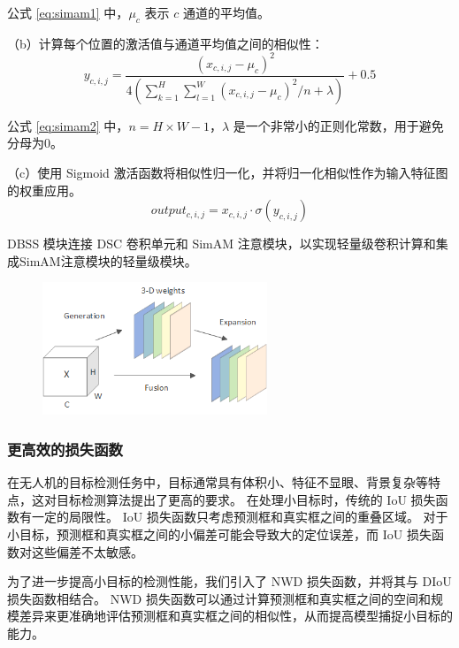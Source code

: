公式 \ref{eq:simam1} 中，$\mu_c$ 表示 $c$ 通道的平均值。

（b）计算每个位置的激活值与通道平均值之间的相似性：
\begin{equation}
    \label{eq:simam2}
    y_{c,i,j} = \frac{(x_{c,i,j}-\mu_c)^2}{4\left(\sum_{k=1}^{H}\sum_{l=1}^{W}(x_{c,i,j}-\mu_c)^2/n+\lambda \right)}+0.5
\end{equation}

公式 \ref{eq:simam2} 中，$n={H}\times{W}-1$，$\lambda$ 是一个非常小的正则化常数，用于避免分母为$0$。

（c）使用 Sigmoid 激活函数将相似性归一化，并将归一化相似性作为输入特征图的权重应用。
\begin{equation}
    \label{eq:simam3}
    output_{c,i,j} = x_{c,i,j} \cdot \sigma(y_{c,i,j})
\end{equation}

DBSS 模块连接 DSC 卷积单元和 SimAM 注意模块，以实现轻量级卷积计算和集成SimAM注意模块的轻量级模块。

\begin{figure}[htbp]
    \centering
    \includegraphics[width=0.6\textwidth]{../figure/SimAM.png}
    \captionsetup{font=footnotesize}
    \label{fig:SimAM}
\end{figure}

\subsubsection{更高效的损失函数}

在无人机的目标检测任务中，目标通常具有体积小、特征不显眼、背景复杂等特点，这对目标检测算法提出了更高的要求。 在处理小目标时，传统的 IoU 损失函数有一定的局限性。
IoU 损失函数只考虑预测框和真实框之间的重叠区域。 对于小目标，预测框和真实框之间的小偏差可能会导致大的定位误差，而 IoU 损失函数对这些偏差不太敏感。

为了进一步提高小目标的检测性能，我们引入了 NWD 损失函数，并将其与 DIoU 损失函数相结合。
NWD 损失函数可以通过计算预测框和真实框之间的空间和规模差异来更准确地评估预测框和真实框之间的相似性，从而提高模型捕捉小目标的能力。

